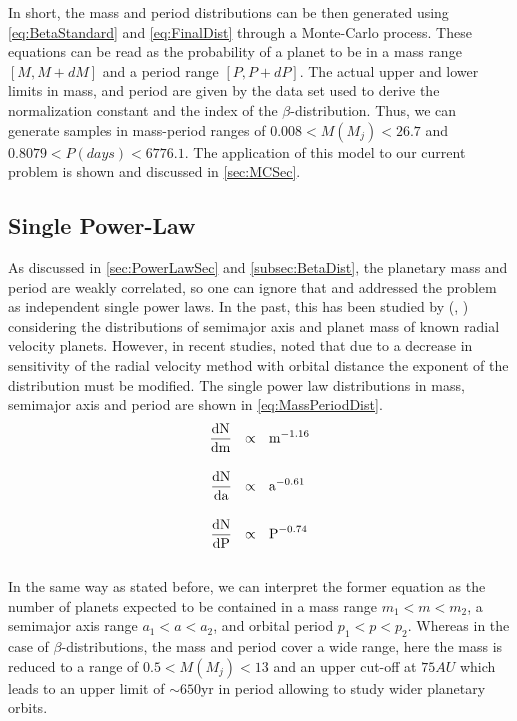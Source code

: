 In short, the mass and period distributions can be then generated using \autoref{eq:BetaStandard} and \autoref{eq:FinalDist} through a Monte-Carlo process. These equations can be read as the probability of a planet to be in a mass range $[M, M + dM]$ and a period range $[P, P + dP]$. The actual upper and lower limits in mass, and period are given by the data set used to derive the normalization constant and the index of the $\beta$-distribution. Thus, we can generate samples in mass-period ranges of $0.008 < M(M_j) < 26.7$ and $0.8079 < P(days) < 6776.1$. The application of this model to our current problem is shown and discussed in \autoref{sec:MCSec}.


\subsection{Single Power-Law}\label{subsec:SPLDist}

As discussed in \autoref{sec:PowerLawSec} and \autoref{subsec:BetaDist}, the planetary mass and period are weakly correlated, so one can ignore that and addressed the problem as independent single power laws. In the past, this has been studied by (\citeyear{2008PASP..120..531C}, \citeyear{2006ApJ...646..505B}) considering the distributions of semimajor axis and planet mass of known radial velocity planets. However, in recent studies, \citeyear{2010EAS....41..107N} noted that due to a decrease in sensitivity of the radial velocity method with orbital distance the exponent of the distribution must be modified. The single power law distributions in mass, semimajor axis and period are shown in \autoref{eq:MassPeriodDist}.\\

\begingroup
\Large
\begin{equation}
  \begin{align*}
    \frac{\textnormal{dN}}{\textnormal{dm}}~~&\propto~~\textnormal{m}^{-1.16} \\[10pt]
    \frac{\textnormal{dN}}{\textnormal{da}}~~&\propto~~\textnormal{a}^{-0.61} \\[10pt]
    \frac{\textnormal{dN}}{\textnormal{dP}}~~&\propto~~\textnormal{P}^{-0.74}
    \label{eq:MassPeriodDist}    
 \end{align*}
\end{equation}
\endgroup\\

In the same way as stated before, we can interpret the former equation as the number of planets expected to be contained in a mass range $m_1 < m < m_2$, a semimajor axis range $a_1 < a < a_2$, and orbital period $p_1 < p < p_2$. Whereas in the case of $\beta$-distributions, the mass and period cover a wide range, here the mass is reduced to a range of $0.5 < M(M_j) < 13$ and an upper cut-off at $75 AU$ which leads to an upper limit of $\sim 650$yr in period allowing to study wider planetary orbits.    

